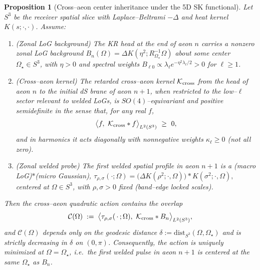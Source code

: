\documentclass[10pt]{article}
\theoremstyle{definition}
\theoremstyle{plain}
\newtheorem{proposition}{Proposition}[section]
\begin{document}
\begin{proposition}[Cross–aeon center inheritance under the 5D SK functional]
\label{prop:aeon-center-inheritance}
Let $S^3$ be the receiver spatial slice with Laplace--Beltrami $-\Delta$ and heat kernel $K(s;\cdot,\cdot)$.
Assume:
\begin{enumerate}[leftmargin=1.8em,label=(A\arabic*)]
\item (Zonal LoG background) The KR head at the end of aeon $n$ carries a nonzero \emph{zonal} LoG background
\(
B_n(\Omega)=\Delta K(\eta^2;R_{\Omega_\star}^{-1}\Omega)
\)
about some center $\Omega_\star\in S^3$, with $\eta>0$ and spectral weights $B_{\ell 0}\propto \lambda_\ell e^{-\eta^2\lambda_\ell/2}>0$ for $\ell\ge 1$.
\item (Cross–aeon kernel) The retarded cross–aeon kernel $\mathcal K_{\rm cross}$ from the head of aeon $n$
to the initial dS brane of aeon $n{+}1$, when restricted to the low–$\ell$ sector relevant to welded LoGs,
is $SO(4)$–equivariant and positive semidefinite in the sense that, for any real $f$,
\[
\big\langle f,\ \mathcal K_{\rm cross}*f\big\rangle_{L^2(S^3)}\ \ge\ 0,
\]
and in harmonics it acts diagonally with nonnegative weights $\kappa_\ell\ge 0$ (not all zero).
\item (Zonal welded probe) The first welded spatial profile in aeon $n{+}1$ is a (macro LoG)$\ast$(micro Gaussian),
\(
\tau_{\rho,\sigma}(\cdot;\Omega)=\big(\Delta K(\rho^2;\cdot,\Omega)\big)\ast K(\sigma^2;\cdot,\Omega),
\)
centered at $\Omega\in S^3$, with $\rho,\sigma>0$ fixed (band–edge locked scales).
\end{enumerate}
Then the cross–aeon quadratic action contains the overlap
\[
\mathcal C(\Omega)\;:=\;\big\langle \tau_{\rho,\sigma}(\,\cdot\,;\Omega),\ \mathcal K_{\rm cross} * B_n\big\rangle_{L^2(S^3)},
\]
and $\mathcal C(\Omega)$ depends only on the geodesic distance $\delta:=\mathrm{dist}_{S^3}(\Omega,\Omega_\star)$ and is
\emph{strictly decreasing} in $\delta$ on $(0,\pi)$. Consequently, the action is uniquely minimized at $\Omega=\Omega_\star$,
i.e.\ the first welded pulse in aeon $n{+}1$ is centered at the same $\Omega_\star$ as $B_n$.
\end{proposition}
\end{document}
